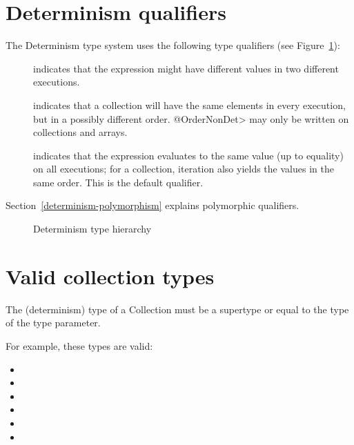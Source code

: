 \section{Determinism qualifiers\label{determinism-qualifiers}}

The Determinism type system uses the following type qualifiers (see Figure~\ref{fig-determinism-hierarchy}):
\begin{description}
\item[] indicates
  that the expression might have different values in two different executions.
\item[] indicates that
  a collection will have the same elements in every execution, but in a
  possibly different order.  \<@OrderNonDet> may only be written on
  collections and arrays.
\item[] indicates that
  the expression evaluates to the same value (up to equality) on all
  executions; for a collection, iteration also yields the values in the same
  order.
  This is the default qualifier.
\end{description}

Section~\ref{determinism-polymorphism} explains polymorphic qualifiers.

\begin{figure}
  \begin{center}
  \end{center}
\caption{Determinism type hierarchy}
\label{fig-determinism-hierarchy}
\end{figure}


\section{Valid collection types\label{determinism-collection-types}}

The (determinism) type of a Collection must be a supertype or equal to
the type of the type parameter.

For example, these types are valid:
\begin{itemize}
    \item {}
    \item {}
    \item {}
    \item {}
    \item {}
    \item {}
\end{itemize}


